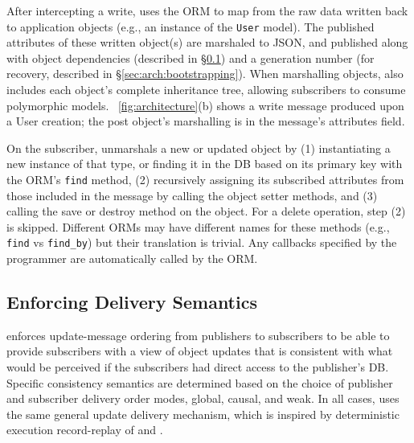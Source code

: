 After intercepting a write, \synapse uses the ORM to map from the raw data
written back to application objects (e.g., an instance of the {\tt User} model).
The published attributes of these written object(s) are marshaled to JSON, and published
along with object dependencies (described in
\S\ref{sec:arch:cross-db-causality}) and a generation number (for recovery,
described in \S\ref{sec:arch:bootstrapping}). When marshalling objects,
\synapse also includes each object's complete inheritance tree, allowing
subscribers to consume polymorphic models.
\F~\ref{fig:architecture}(b) shows a write message produced
upon a {\code User} creation; the post object's marshalling is in the message's
{\code attributes} field.

On the subscriber, \synapse unmarshals a new or updated object by (1)
instantiating a new instance of that type, or finding it in the DB based on its primary key with
the ORM's {\tt find} method, (2) recursively assigning its
subscribed attributes from those included in the message by calling the
object setter methods, and (3) calling the {\code save} or {\code
destroy} method on the object. For a delete operation, step (2) is skipped.
Different ORMs may have different names for these methods (e.g., {\tt find} vs
{\tt find\_by}) but their translation is trivial. Any callbacks specified by the
programmer are automatically called by the ORM.

\subsection{Enforcing Delivery Semantics} \label{sec:arch:cross-db-causality}

\synapse enforces update-message ordering from publishers to
subscribers to be able to provide subscribers with a view of object updates that 
is consistent with what would be perceived if the subscribers had
direct access to the publisher's DB.  Specific consistency
semantics are determined based on the choice of publisher and
subscriber delivery order modes, global, causal, and weak.  In all
cases, \synapse uses the same general update delivery mechanism,
which is inspired by deterministic execution record-replay of \scribe and \dora.

